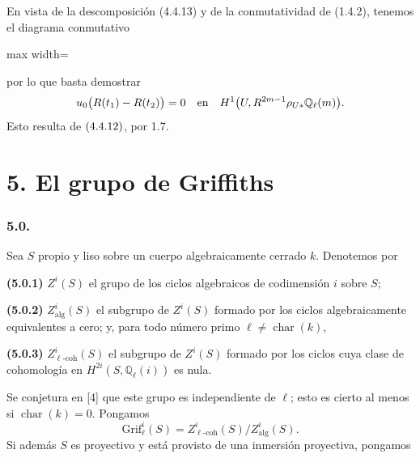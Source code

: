 En vista de la descomposición (4.4.13) y de la conmutatividad de (1.4.2),
tenemos el diagrama conmutativo
\begin{center}
\small
\begin{adjustbox}{max width=\linewidth}\end{adjustbox}
\end{center}
por lo que basta demostrar
\begin{equation*}
u_0\bigl(R(t_1)-R(t_2)\bigr)=0
\quad\text{en}\quad
H^1\bigl(U,R^{\sisi{2n-1}{2m-1}}\rho_{U*}
 \mathbb Q_\ell(\sisi{n}{m})\bigr).
\end{equation*}
Esto resulta de $\sisi{(4.3.12)}{(4.4.12)}$, por 1.7.

\section*{5. El grupo de Griffiths}

\subsubsection*{5.0.}
Sea $S$ propio y liso sobre un cuerpo algebraicamente cerrado $k$.
Denotemos por

\pageoriginale

\medskip
\noindent\textbf{(5.0.1)} $Z^i(S)$ el grupo de los ciclos algebraicos de
codimensión $i$ sobre $S$;

\noindent\textbf{(5.0.2)} $Z^i_{\mathrm{alg}}(S)$ el subgrupo de $Z^i(S)$
formado por los ciclos algebraicamente equivalentes a cero; y, para todo
número primo $\ell\ne\operatorname{char}(k)$,

\noindent\textbf{(5.0.3)} $Z^i_{\ell\text{-}\mathrm{coh}}(S)$ el
subgrupo de $Z^i(S)$ formado por los ciclos cuya clase de cohomología en
$H^{2i}(S,\mathbb Q_\ell(i))$ es nula.

Se conjetura en [4] que este grupo es independiente de $\ell$; esto es
cierto al menos si $\operatorname{char}(k)=0$. Pongamos
\begin{equation}\tag{5.0.4}
\mathrm{Grif}^i_\ell(S)
=Z^i_{\ell\text{-}\mathrm{coh}}(S)/Z^i_{\mathrm{alg}}(S).
\end{equation}
Si además $S$ es proyectivo y está provisto de una inmersión proyectiva,
pongamos


